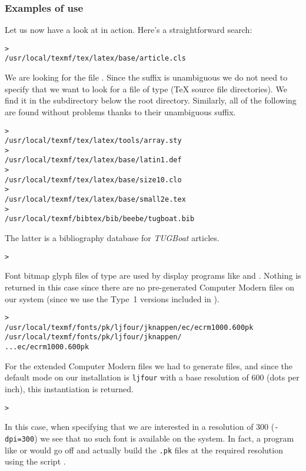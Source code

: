 \documentclass{article}
\begin{document}
\begin{multicols}{2}
\subsubsection{Examples of use}
\label{SExamplesofuse}

Let us now have a look at \KPS{} in action.  Here's a straightforward search:

\begin{alltt}
> 
/usr/local/texmf/tex/latex/base/article.cls
\end{alltt}
We are looking for the file . Since the 
suffix is unambiguous we do not need to specify that we want to look for a
file of type  (\TeX{} source file directories). We find it in
the subdirectory  below the  root
directory.  Similarly, all of the following are found without problems
thanks to their unambiguous suffix.
\begin{alltt}
> 
   /usr/local/texmf/tex/latex/tools/array.sty
> 
   /usr/local/texmf/tex/latex/base/latin1.def
> 
   /usr/local/texmf/tex/latex/base/size10.clo
> 
   /usr/local/texmf/tex/latex/base/small2e.tex
> 
   /usr/local/texmf/bibtex/bib/beebe/tugboat.bib
\end{alltt}

The latter is a \BibTeX{} bibliography database for \textsl{TUGBoat} articles.

\begin{alltt}
> 
\end{alltt}
Font bitmap glyph files of type  are used by display
programs like  and .  Nothing is returned in
this case since there are no pre-generated Computer Modern 
files on our system (since we use the Type~1 versions included in \TeXLive{}).
\begin{alltt}
> 
\ifSingleColumn   /usr/local/texmf/fonts/pk/ljfour/jknappen/ec/ecrm1000.600pk
\else
/usr/local/texmf/fonts/pk/ljfour/jknappen/
...                         ec/ecrm1000.600pk
\fi\end{alltt}
For the extended Computer Modern files we had to generate 
files, and since the default \MF{} mode on our installation is
\texttt{ljfour} with a base resolution of 600\dpi{} (dots per inch),
this instantiation is returned.
\begin{alltt}
> 
\end{alltt}
In this case, when specifying that we are interested in a resolution
of 300\dpi{} (\texttt{-dpi=300}) we see that no such font is available on
the system. In fact, a program like  or  would
go off and actually build the \texttt{.pk} files at the required
resolution using the script .


\end{multicols}
\end{document}
